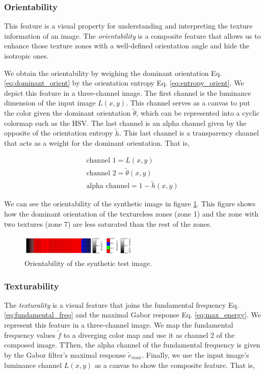\documentclass[journal]{IEEEtran}
\begin{document}
\subsubsection{Orientability}
This feature is a visual property for understanding and interpreting the texture information of an image. The \textit{orientability} is a composite feature that allows us to enhance those texture zones with a well-defined orientation angle and hide the isotropic ones.

We obtain the orientability by weighing the dominant orientation Eq. \eqref{eq:dominant_orient} by the orientation entropy Eq. \eqref{eq:entropy_orient}. We depict this feature in a three-channel image. The first channel is the luminance dimension of the input image $L(x,y)$. This channel serves as a canvas to put the color given the dominant orientation $\widetilde{\theta}$, which can be represented into a cyclic colormap such as the HSV. The last channel is an alpha channel given by the opposite of the orientation entropy $\widetilde{h}$. This last channel is a transparency channel that acts as a weight for the dominant orientation. That is,

\begin{gather}
    \text{channel 1} = L(x,y) \\
    \text{channel 2} = \widetilde{\theta}(x,y) \\
    \text{alpha channel}= 1 - \widetilde{h}(x,y)
\end{gather}

We can see the orientability of the synthetic image in figure \ref{fig:orientability_synth}. This figure shows how the dominant orientation of the textureless zones (zone 1) and the zone with two textures (zone 7) are less saturated than the rest of the zones. 

\begin{figure}[!ht]
	\includegraphics[width=0.5\textwidth]{orientability_synth}
    \caption{Orientability of the synthetic test image.}
    \label{fig:orientability_synth}
\end{figure}

\subsubsection{Texturability}
The \textit{texturality} is a visual feature that joins the fundamental frequency Eq. \eqref{eq:fundamental_freq} and the maximal Gabor response Eq. \eqref{eq:max_energy}. We represent this feature in a three-channel image. We map the fundamental frequency values $\widetilde{f}$ to a diverging color map and use it as channel 2 of the composed image. TThen, the alpha channel of the fundamental frequency is given by the Gabor filter's maximal response $\widetilde{e}_{max}$. Finally, we use the input image's luminance channel $L(x,y)$ as a canvas to show the composite feature. That is,
\end{document}

